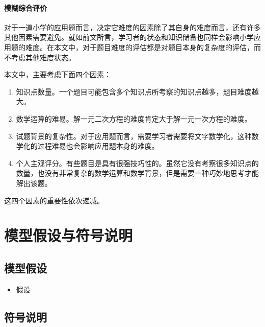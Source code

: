 \paragraph{模糊综合评价}

对于一道小学的应用题而言，决定它难度的因素除了其自身的难度而言，还有许多其他因素需要避免。就如前文所言，学习者的状态和知识储备也同样会影响小学应用题的难度。在本文中，对于题目难度的评估都是对题目本身的复杂度的评估，而不考虑其他难度状态。

本文中，主要考虑下面四个因素：

\begin{enumerate}
    \item 知识点数量。一个题目可能包含多个知识点所考察的知识点越多，题目难度越大。
    \item 数学运算的难易。解一元二次方程的难度肯定大于解一元一次方程的难度。
    \item 试题背景的复杂性。对于应用题而言，需要学习者需要将文字数学化，这种数学化的过程难易也会影响应用题本身的难度。
    \item 个人主观评分。有些题目是具有很强技巧性的。虽然它没有考察很多知识点的数量，也没有非常复杂的数学运算和数学背景，但是需要一种巧妙地思考才能解出该题。
\end{enumerate}

这四个因素的重要性依次递减。

%
%

\section{模型假设与符号说明}

\subsection{模型假设}

\begin{itemize}
    \item 假设 
\end{itemize}

\subsection{符号说明}